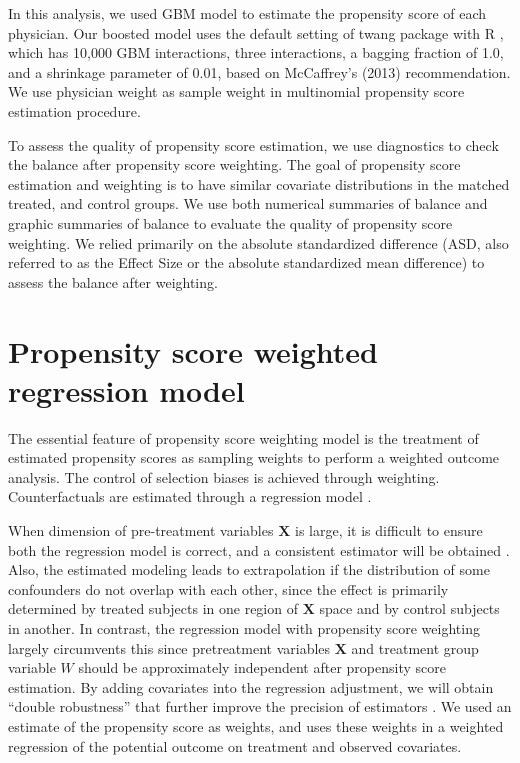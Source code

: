 \documentclass[12pt]{report}
\begin{document}
In this analysis, we used GBM model \citep{mccaffrey2004propensity} to estimate the propensity score of each physician. Our boosted model uses the default setting of twang package \citep{mccaffrey2013tutorial} with R \citep{rbase}, which has 10,000 GBM interactions, three interactions, a bagging fraction of 1.0, and a shrinkage parameter of 0.01, based on McCaffrey's (2013) recommendation. We use physician weight as sample weight in multinomial propensity score estimation procedure.

To assess the quality of propensity score estimation, we use diagnostics to check the balance after propensity score weighting. The goal of propensity score estimation and weighting is to have similar covariate distributions in the matched treated, and control groups. We use both numerical summaries of balance and graphic summaries of balance to evaluate the quality of propensity score weighting. We relied primarily on the absolute standardized difference (ASD, also referred to as the Effect Size or the absolute standardized mean difference) to assess the balance after weighting. 

\section{Propensity score weighted regression model}
The essential feature of propensity score weighting model is the treatment of estimated propensity scores as sampling weights to perform a weighted outcome analysis. The control of selection biases is achieved through weighting. Counterfactuals are estimated through a regression model \citep{guo2014propensity}.

When dimension of pre-treatment variables $\textbf{X}$ is large, it is difficult to ensure both the regression model is correct, and a consistent estimator will be obtained \citep{rubin1997estimating}. Also, the estimated modeling leads to extrapolation if the distribution of some confounders do not overlap with each other, since the effect is primarily determined by treated subjects in one region of $\textbf{X}$ space and by control subjects in another. In contrast, the regression model with propensity score weighting largely circumvents this since pretreatment variables $\textbf{X}$ and treatment group variable $W$ should be approximately independent after propensity score estimation. By adding covariates into the regression adjustment, we will obtain ``double robustness'' that further improve the precision of estimators \citep{lunceford2004stratification}. We used an estimate of the propensity score as weights, and uses these weights in a weighted regression of the potential outcome on treatment and observed covariates.
\end{document}
